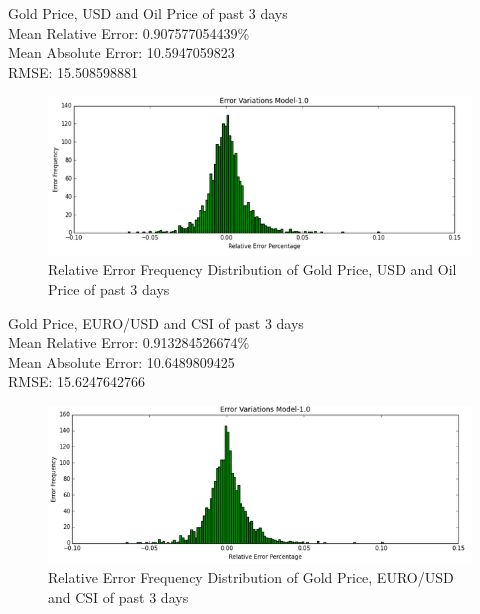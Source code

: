 \documentclass[runningheads]{llncs}
\begin{document}
\noindent Gold Price, USD and Oil Price of past 3 days \\
Mean Relative Error: 0.907577054439\% \\
Mean Absolute Error: 10.5947059823 \\
RMSE: 15.508598881 \\
\begin{figure}
\centering
\includegraphics[width=\textwidth]{GoldUSDOil_Daily.png}
\caption{Relative Error Frequency Distribution of Gold Price, USD and Oil Price of past 3 days}
\label{fig:GoldUSDOil_Daily.png}
\end{figure}

\noindent Gold Price, EURO/USD and CSI of past 3 days \\
Mean Relative Error: 0.913284526674\% \\
Mean Absolute Error: 10.6489809425 \\
RMSE: 15.6247642766 \\
\begin{figure}
\centering
\includegraphics[width=\textwidth]{GoldEuroCSI_Daily.png}
\caption{Relative Error Frequency Distribution of Gold Price, EURO/USD and CSI of past 3 days}
\label{fig:GoldEuroCSI_Daily.png}
\end{figure}
\end{document}
